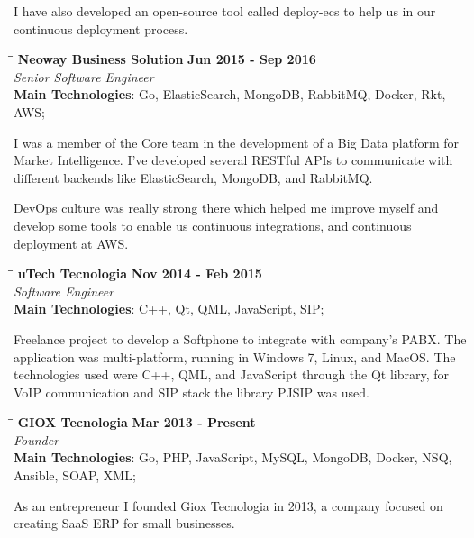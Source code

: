 \documentclass[margin]{res}
\begin{document}
\begin{resume}
I have also developed an open-source tool called deploy-ecs to help us in our continuous deployment process.

\vspace{-0.1in}
    \begin{tabbing}
    \hspace{2.3in}\= \hspace{1.7in}\= \kill %
    \textbf{Neoway Business Solution}    \>\>\textbf{Jun 2015 - Sep 2016}\\
    \textit{Senior Software Engineer}\\
    \textbf{Main Technologies}: Go, ElasticSearch, MongoDB, RabbitMQ, Docker, Rkt, AWS;
    \end{tabbing}\vspace{-20pt}      %
    \vspace{2mm}
I was a member of the Core team in the development of a Big Data platform for Market Intelligence. I've developed several RESTful APIs to communicate with different backends like ElasticSearch, MongoDB, and RabbitMQ.

DevOps culture was really strong there which helped me improve myself and develop some tools to enable us continuous integrations, and continuous deployment at AWS.

\vspace{-0.1in}
    \begin{tabbing}
    \hspace{2.3in}\= \hspace{1.7in}\= \kill
    \textbf{uTech Tecnologia}    \>\>\textbf{Nov 2014 - Feb 2015}\\
    \textit{Software Engineer}\\
    \textbf{Main Technologies}: C++, Qt, QML, JavaScript, SIP;
    \end{tabbing}\vspace{-20pt}
    \vspace{2mm}
Freelance project to develop a Softphone to integrate with company’s PABX. The application was multi-platform, running in Windows 7, Linux, and MacOS. The technologies used were C++, QML, and JavaScript through the Qt library, for VoIP communication and SIP stack the library PJSIP was used.

\vspace{-0.1in}
    \begin{tabbing}
    \hspace{2.3in}\= \hspace{1.7in}\= \kill
    \textbf{GIOX Tecnologia}    \>\>\textbf{Mar 2013 - Present}\\
    \textit{Founder}\\
    \textbf{Main Technologies}: Go, PHP, JavaScript, MySQL, MongoDB, Docker, NSQ, Ansible, SOAP, XML;
    \end{tabbing}\vspace{-20pt}
    \vspace{2mm}
As an entrepreneur I founded Giox Tecnologia in 2013, a company focused on creating SaaS ERP for small businesses.


\end{resume}
\end{document}
